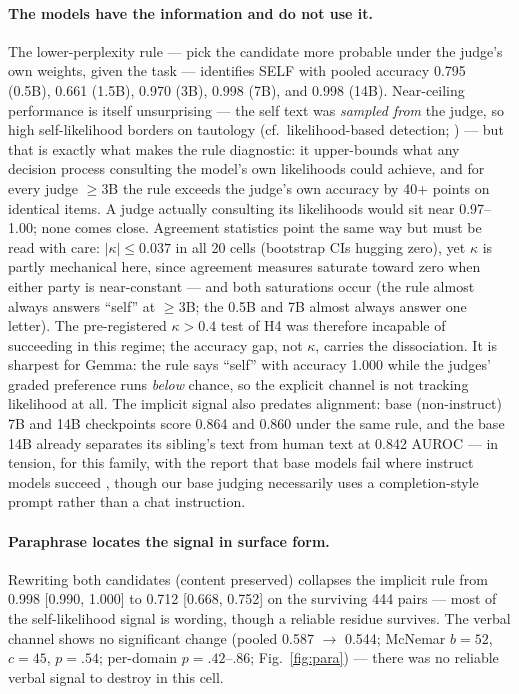 \documentclass[11pt]{article}
\begin{document}
\paragraph{The models have the information and do not use it.}
The lower-perplexity rule --- pick the candidate more probable under the
judge's own weights, given the task --- identifies SELF with pooled
accuracy 0.795 (0.5B), 0.661 (1.5B), 0.970 (3B), 0.998 (7B), and 0.998
(14B). Near-ceiling performance is itself unsurprising --- the self text
was \emph{sampled from} the judge, so high self-likelihood borders on
tautology (cf.\ likelihood-based detection;
\citealp{mitchell2023detectgpt}) --- but that is exactly what makes the
rule diagnostic: it upper-bounds what any decision process consulting the
model's own likelihoods could achieve, and for every judge $\geq$3B the
rule exceeds the judge's own accuracy by 40+ points on identical items. A
judge actually consulting its likelihoods would sit near 0.97--1.00; none
comes close. Agreement statistics point the same way but must be read with
care: $|\kappa| \leq 0.037$ in all 20 cells (bootstrap CIs hugging zero),
yet $\kappa$ is partly mechanical here, since agreement measures saturate
toward zero when either party is near-constant --- and both saturations
occur (the rule almost always answers ``self'' at $\geq$3B; the 0.5B and
7B almost always answer one letter). The pre-registered $\kappa > 0.4$
test of H4 was therefore incapable of succeeding in this regime; the
accuracy gap, not $\kappa$, carries the dissociation. It is sharpest for
Gemma: the rule says ``self'' with accuracy 1.000 while the judges' graded
preference runs \emph{below} chance, so the explicit channel is not
tracking likelihood at all. The implicit signal also predates alignment:
base (non-instruct) 7B and 14B checkpoints score 0.864 and 0.860 under the
same rule, and the base 14B already separates its sibling's text from
human text at 0.842 AUROC --- in tension, for this family, with the report
that base models fail where instruct models succeed
\citep{zhou2025implicit}, though our base judging necessarily uses a
completion-style prompt rather than a chat instruction.

\paragraph{Paraphrase locates the signal in surface form.}
Rewriting both candidates (content preserved) collapses the implicit rule
from 0.998 [0.990, 1.000] to 0.712 [0.668, 0.752] on the surviving 444
pairs --- most of the self-likelihood signal is wording, though a reliable
residue survives. The verbal channel shows no significant change (pooled
0.587 $\rightarrow$ 0.544; McNemar $b{=}52$, $c{=}45$, $p = .54$;
per-domain $p = .42$--$.86$; Fig.~\ref{fig:para}) --- there was no
reliable verbal signal to destroy in this cell.
\end{document}
